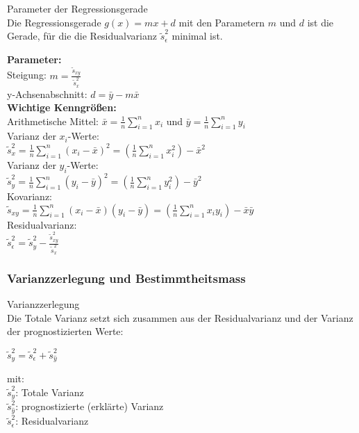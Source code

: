 \begin{theorem}{Parameter der Regressionsgerade}\\
Die Regressionsgerade $g(x) = mx + d$ mit den Parametern $m$ und $d$ ist die Gerade, für die die Residualvarianz $\tilde{s}_\epsilon^2$ minimal ist.

\textbf{Parameter:}\\
Steigung: $m = \frac{\tilde{s}_{xy}}{\tilde{s}_x^2}$\\
y-Achsenabschnitt: $d = \bar{y} - m\bar{x}$\\

\textbf{Wichtige Kenngrößen:}\\
Arithmetische Mittel: $\bar{x} = \frac{1}{n}\sum_{i=1}^n x_i$ und $\bar{y} = \frac{1}{n}\sum_{i=1}^n y_i$\\

Varianz der $x_i$-Werte:\\
$\tilde{s}_x^2 = \frac{1}{n}\sum_{i=1}^n (x_i-\bar{x})^2 = (\frac{1}{n}\sum_{i=1}^n x_i^2) - \bar{x}^2$\\

Varianz der $y_i$-Werte:\\
$\tilde{s}_y^2 = \frac{1}{n}\sum_{i=1}^n (y_i-\bar{y})^2 = (\frac{1}{n}\sum_{i=1}^n y_i^2) - \bar{y}^2$\\

Kovarianz:\\
$\tilde{s}_{xy} = \frac{1}{n}\sum_{i=1}^n (x_i-\bar{x})(y_i-\bar{y}) = (\frac{1}{n}\sum_{i=1}^n x_iy_i) - \bar{x}\bar{y}$\\

Residualvarianz:\\
$\tilde{s}_\epsilon^2 = \tilde{s}_y^2 - \frac{\tilde{s}_{xy}^2}{\tilde{s}_x^2}$\\
\end{theorem}

\subsubsection{Varianzzerlegung und Bestimmtheitsmass}

\begin{concept}{Varianzzerlegung}\\
Die Totale Varianz setzt sich zusammen aus der Residualvarianz und der Varianz der prognostizierten Werte:

$\tilde{s}_y^2 = \tilde{s}_\epsilon^2 + \tilde{s}_{\hat{y}}^2$

mit:\\
$\tilde{s}_y^2$: Totale Varianz\\
$\tilde{s}_{\hat{y}}^2$: prognostizierte (erklärte) Varianz\\
$\tilde{s}_\epsilon^2$: Residualvarianz
\end{concept}

